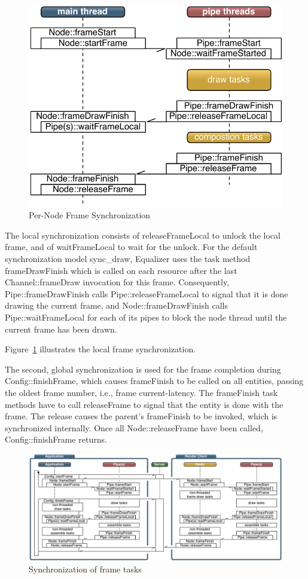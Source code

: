 \documentclass[10pt,a4]{scrartcl}
\newcommand{\fig}[1]{Figure~\ref{#1}}
\begin{document}
\begin{figure}
  \includegraphics[width=.618\textwidth]{images/frameSync.pdf}
  {\caption{\small\label{fFrameSync}Per-Node Frame Synchronization}}
\end{figure}
The local synchronization consists of \textsf{releaseFrameLocal} to
unlock the local frame, and of \textsf{waitFrameLocal} to wait for the
unlock. For the default synchronization model \textsf{sync\_draw},
Equalizer uses the task method \textsf{frameDrawFinish} which is called
on each resource after the last \textsf{Channel::frameDraw} invocation
for this frame. Consequently, \textsf{Pipe::frameDraw\-Fi\-nish} calls
\textsf{Pipe::\-release\-Frame\-Lo\-cal} to signal that it is done
drawing the current frame, and \textsf{Node::frameDrawFinish} calls
\textsf{Pipe::waitFrameLocal} for each of its pipes to block the node
thread until the current frame has been drawn.

\fig{fFrameSync} illustrates the local frame synchronization.

The second, global synchronization is used for the frame completion
during \textsf{Config::finishFrame}, which causes \textsf{frameFinish}
to be called on all entities, passing the oldest frame number, i.e., frame
\textsf{current-latency}. The \textsf{frameFinish} task methods have to
call \textsf{releaseFrame} to signal that the entity is done with the
frame. The release causes the parent's \textsf{frameFinish} to be
invoked, which is synchronized internally. Once all
\textsf{Node::releaseFrame} have been called,
\textsf{Config::finishFrame} returns.

\begin{figure}[ht!]\center
  \includegraphics[width=\textwidth]{images/mainloop.pdf}
  {\caption{\small\label{fMainLoop}Synchronization of frame tasks}}
\end{figure}
\end{document}
